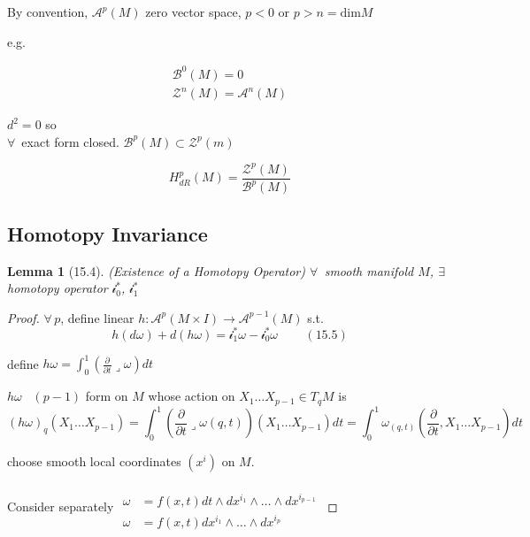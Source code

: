 \documentclass[twoside]{amsart}
\theoremstyle{plain}
\newtheorem{lemma}{Lemma}
\theoremstyle{definition}
\begin{document}
By convention, $\mathcal{A}^p(M)$ zero vector space, $p < 0$ or $p>n = \text{dim}{M}$

e.g.

\[
\begin{aligned}
  \mathcal{B}^0(M)=0 \\ 
  \mathcal{Z}^n(M) = \mathcal{A}^n(M)
\end{aligned}
\]

$d^2=0$ so \\
$\forall \, $ exact form closed.  $\mathcal{B}^p(M) \subset \mathcal{Z}^p(m)$

\[
H^p_{dR}(M) = \frac{\mathcal{Z}^p(M)}{ \mathcal{B}^p(M) }
\]


\subsection*{Homotopy Invariance}

\begin{lemma}[15.4] (Existence of a Homotopy Operator)
  $\forall \, $ smooth manifold $M$, $\exists \, $ homotopy operator $\mathcal{i}_0^*$, $\mathcal{i}^*_1$
\end{lemma}

\begin{proof} $\forall \, p$, define linear $h: \mathcal{A}^p(M\times I) \to \mathcal{A}^{p -1}(M)$ s.t. 
\begin{equation}
h(d\omega ) + d(h \omega) = \mathcal{i}^*_1 \omega - \mathcal{i}_0^*\omega  \quad \quad \, (15.5)
\end{equation}


define $h\omega = \int_0^1 \left( \frac{ \partial }{\partial t} \lrcorner \omega \right) dt$


$h \omega$ \, $(p-1)$ form on $M$ whose action on $X_1 \dots X_{p-1} \in T_qM$ is 
\[
(h\omega)_q(X_1  \dots X_{p-1}) = \int_0^1 \left( \frac{ \partial }{ \partial t} \lrcorner \omega(q,t) \right)(X_1 \dots X_{p-1} ) dt = \int_0^1 \omega_{(q,t)}\left( \frac{ \partial}{\partial t}, X_1 \dots X_{p-1} \right) dt 
\]

choose smooth local coordinates $(x^i)$ on $M$.

Consider separately $\begin{aligned} & \quad \\ 
  \omega  & = f(x,t) dt \wedge dx^{i_1} \wedge \dots \wedge dx^{i_{p-1} } \\  
  \omega & = f(x,t) dx^{i_1} \wedge \dots \wedge dx^{i_p } \end{aligned}$


\end{proof}
\end{document}
